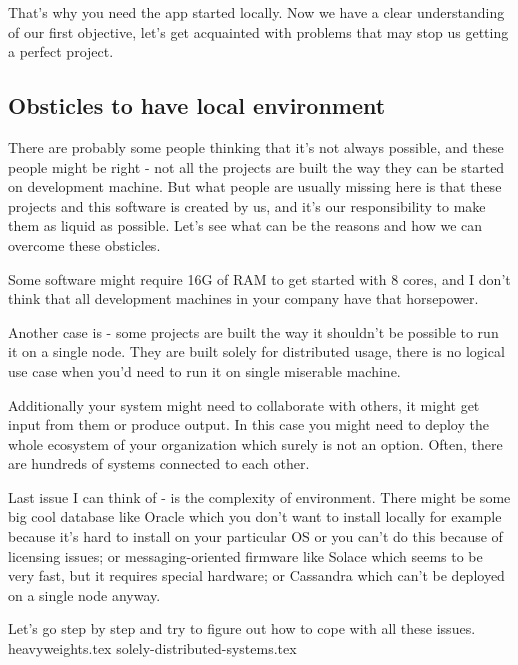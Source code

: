 That's why you need the app started locally. Now we have a clear understanding of our first objective, let's get acquainted with problems that may stop us getting a perfect project.

\subsection{Obsticles to have local environment}

There are probably some people thinking that it's not always possible, and these people might be right - not all the projects are built the way they can be started on development machine. But what people are usually missing here is that these projects and this software is created by us, and it's our responsibility to make them as liquid as possible. Let's see what can be the reasons and how we can overcome these obsticles.

Some software might require 16G of RAM to get started with 8 cores, and I don't think that all development machines in your company have that horsepower. 

Another case is - some projects are built the way it shouldn't be possible to run it on a single node. They are built solely for distributed usage, there is no logical use case when you'd need to run it on single miserable machine.

Additionally your system might need to collaborate with others, it might get input from them or produce output. In this case you might need to deploy the whole ecosystem of your organization which surely is not an option. Often, there are hundreds of systems connected to each other.

Last issue I can think of - is the complexity of environment. There might be some big cool database like Oracle which you don't want to install locally for example because it's hard to install on your particular OS or you can't do this because of licensing issues; or messaging-oriented firmware like Solace which seems to be very fast, but it requires special hardware; or Cassandra which can't be deployed on a single node anyway. 

Let's go step by step and try to figure out how to cope with all these issues.
{heavyweights.tex}
{solely-distributed-systems.tex}
